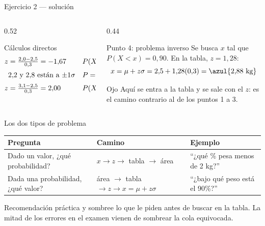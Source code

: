 \documentclass[aspectratio=169,10pt]{beamer}
\begin{document}
\begin{frame}{Ejercicio 2 — solución}
  \begin{columns}[T,onlytextwidth]
    \begin{column}{0.52\textwidth}
      \begin{block}{Cálculos directos}
        \footnotesize
        \begin{align*}
          z&=\tfrac{2{,}0-2{,}5}{0{,}3}=-1{,}67 &&P(X<2{,}0)=\azul{0{,}0478}\\[0.2em]
          &\text{$2{,}2$ y $2{,}8$ están a $\pm 1\sigma$} &&P=\azul{0{,}6827}\\[0.2em]
          z&=\tfrac{3{,}1-2{,}5}{0{,}3}=2{,}00 &&P(X>3{,}1)=\azul{0{,}0228}
        \end{align*}
      \end{block}
    \end{column}
    \begin{column}{0.44\textwidth}
      \begin{exampleblock}{Punto 4: problema inverso}
        \footnotesize
        Se busca $x$ tal que $P(X<x)=0{,}90$. En la tabla, $z=1{,}28$:
        \[ x=\mu+z\sigma=2{,}5+1{,}28(0{,}3)=\azul{2{,}88\text{ kg}} \]
      \end{exampleblock}
      \begin{alertblock}{Ojo}
        \footnotesize
        Aquí se entra a la tabla  y se sale con el $z$: es el
        camino contrario al de los puntos 1 a 3.
      \end{alertblock}
    \end{column}
  \end{columns}
\end{frame}

\begin{frame}{Los dos tipos de problema}
  \footnotesize
  \begin{center}
  \begin{tabular}{@{}p{4.6cm}p{3.2cm}p{3.6cm}@{}}
    \toprule
    \textbf{Pregunta} & \textbf{Camino} & \textbf{Ejemplo} \\
    \midrule
    Dado un valor, ¿qué probabilidad? &
      $x \rightarrow z \rightarrow$ tabla $\rightarrow$ área &
      ``¿qué \% pesa menos de 2 kg?'' \\
    \addlinespace
    Dada una probabilidad, ¿qué valor? &
      área $\rightarrow$ tabla $\rightarrow z \rightarrow x=\mu+z\sigma$ &
      ``¿bajo qué peso está el 90\%?'' \\
    \bottomrule
  \end{tabular}
  \end{center}

  \vspace{0.25cm}
  \begin{alertblock}{Recomendación práctica}
    \footnotesize
     y sombree lo que le piden antes de
    buscar en la tabla. La mitad de los errores en el examen vienen de sombrear
    la cola equivocada.
  \end{alertblock}
\end{frame}
\end{document}
